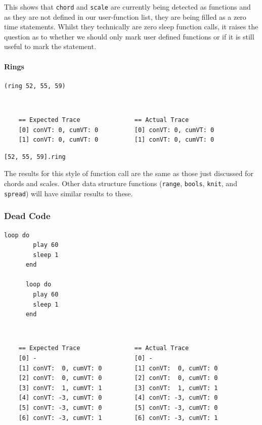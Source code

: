 \documentclass[11pt, abstracton, twoside, titlepage=true]{scrartcl}
\begin{document}
This shows that \texttt{chord} and \texttt{scale} are currently being detected 
as functions and as they are not defined in our user-function list, they are being 
filled as a zero time statements. Whilst they technically are zero sleep function 
calls, it raises the question as to whether we should only mark user defined 
functions or if it is still useful to mark the statement. 

\paragraph{Rings}
\begin{minipage}{\textwidth}
	\begin{lstlisting}[style = sonicpi]
      (ring 52, 55, 59)
	\end{lstlisting}
\end{minipage}
\\
\begin{lstlisting}
    == Expected Trace               == Actual Trace
    [0] conVT: 0, cumVT: 0          [0] conVT: 0, cumVT: 0
    [1] conVT: 0, cumVT: 0          [1] conVT: 0, cumVT: 0
\end{lstlisting}

\begin{minipage}{\textwidth}
	\begin{lstlisting}[style = sonicpi]
      [52, 55, 59].ring
	\end{lstlisting}
\end{minipage}

The results for this style of function call are the same as those just discussed 
for chords and scales. Other data structure functions (\texttt{range}, 
\texttt{bools}, \texttt{knit}, and \texttt{spread}) will have similar results to 
these.

\subsubsection{Dead Code}
\begin{minipage}{\textwidth}
	\begin{lstlisting}[style = sonicpi]
      loop do
        play 60
        sleep 1
      end

      loop do
        play 60
        sleep 1
      end
	\end{lstlisting}
\end{minipage}
\\
\begin{lstlisting}
    == Expected Trace               == Actual Trace
    [0] -                           [0] -
    [1] conVT:  0, cumVT: 0         [1] conVT:  0, cumVT: 0
    [2] conVT:  0, cumVT: 0         [2] conVT:  0, cumVT: 0
    [3] conVT:  1, cumVT: 1         [3] conVT:  1, cumVT: 1
    [4] conVT: -3, cumVT: 0         [4] conVT: -3, cumVT: 0
    [5] conVT: -3, cumVT: 0         [5] conVT: -3, cumVT: 0
    [6] conVT: -3, cumVT: 1         [6] conVT: -3, cumVT: 1
\end{lstlisting}
\end{document}
